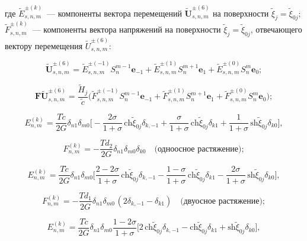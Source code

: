\noindent где $\tilde E_{s,n,m}^{\pm(k)}$~--- компоненты вектора перемещений $\mathbf{\tilde U}_{s,n,m}^{\pm(6)}$ на поверхности $\tilde\xi_j=\tilde\xi_{0j}$; $\tilde F_{s,n,m}^{\pm(k)}$~--- компоненты вектора напряжений на поверхности $\tilde\xi_j=\tilde\xi_{0j}$, отвечающего вектору перемещения $\tilde U_{s,n,m}^{\pm(6)}$:

$$
\mathbf{\tilde U}_{s,n,m}^{\pm(6)}=\tilde E_{s,n,m}^{\pm(-1)}S_n^{m-1}\mathbf{e}_{-1}+\tilde E_{s,n,m}^{\pm(1)}S_n^{m+1}\mathbf{e}_1+\tilde E_{s,n,m}^{\pm(0)}S_n^m\mathbf{e}_0;
$$

$$
\mathbf{F\tilde U}_{s,n,m}^{\pm(6)}=\frac{\tilde H_j}{\tilde c}\bigg(\tilde F_{s,n,m}^{\pm(-1)}S_n^{m-1}\mathbf{e}_{-1}+\tilde F_{s,n,m}^{\pm(1)}S_n^{m+1}\mathbf{e}_1+\tilde F_{s,n,m}^{\pm(0)}S_n^m\mathbf{e}_0\bigg);
$$

\begin{equation*}
E_{n,m}^{(k)} =\frac{T\tilde c}{2G}\delta_{n1}\delta_{m0}\bigg[-\frac{2\sigma}{1+\sigma}\,\mathrm{ch}\tilde\xi_{0j}\delta_{k,-1}+\frac{\sigma}{1+\sigma}\,\mathrm{ch}\tilde\xi_{0j}\delta_{k1}+\frac{1}{1+\sigma}\,\mathrm{sh}\tilde\xi_{0j}\delta_{k0}\bigg],
\end{equation*}

\begin{equation*}
F_{n,m}^{(k)} =  -\frac{Td_2}{2G}{\delta _{n1}}{\delta _{m0}}{\delta _{k0}}\quad\text{(одноосное растяжение)};
\end{equation*}

\begin{equation*}
E_{n,m}^{(k)} =\frac{T\tilde c}{2G}\delta_{n1}\delta_{m0}\bigg[\frac{2-2\sigma}{1+\sigma}\,\mathrm{ch}\tilde\xi_{0j}\delta_{k,-1}-\frac{1-\sigma}{1+\sigma}\,\mathrm{ch}\tilde\xi_{0j}\delta_{k1}-\frac{2\sigma}{1+\sigma}\,\mathrm{sh}\tilde\xi_{0j}\delta_{k0}\bigg],
\end{equation*}

\begin{equation*}
F_{n,m}^{(k)} =  -\frac{Td_1}{2G}{\delta _{n1}}{\delta _{m0\,}}(2{\delta _{k, - 1}} - {\delta _{k1}})\quad\text{(двуосное растяжение)};
\end{equation*}

\begin{equation*}
E_{n,m}^{(k)} =\frac{T\tilde c}{2G}\delta_{n1}\delta_{m0}\frac{1-2\sigma}{1+\sigma}\bigg[2\,\mathrm{ch}\tilde\xi_{0j}\delta_{k,-1}-\mathrm{ch}\tilde\xi_{0j}\delta_{k1}+\mathrm{sh}
\tilde\xi_{0j}\delta_{k0}\bigg],
\end{equation*}

